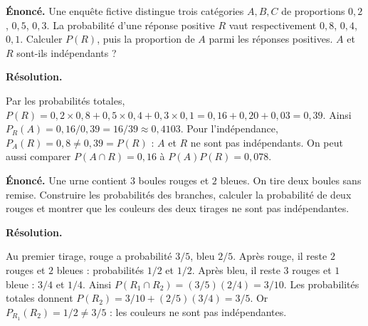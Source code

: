 \documentclass[11pt,a4paper]{article}
\begin{document}
\par\noindent\begin{minipage}{\linewidth}
{\small\color{Muted}\textbf{Énoncé.} Une enquête fictive distingue trois catégories $A,B,C$ de proportions $0,2$, $0,5$, $0,3$. La probabilité d’une réponse positive $R$ vaut respectivement $0,8$, $0,4$, $0,1$. Calculer $P(R)$, puis la proportion de $A$ parmi les réponses positives. $A$ et $R$ sont-ils indépendants ?}
\par\medskip
\textbf{Résolution.}\par
Par les probabilités totales, $P(R)=0,2\times0,8+0,5\times0,4+0,3\times0,1=0,16+0,20+0,03=0,39$. Ainsi $P_R(A)=0,16/0,39=16/39\approx0,4103$. Pour l’indépendance, $P_A(R)=0,8\ne0,39=P(R)$ : $A$ et $R$ ne sont pas indépendants. On peut aussi comparer $P(A\cap R)=0,16$ à $P(A)P(R)=0,078$.
\end{minipage}\par
\par\noindent\begin{minipage}{\linewidth}
{\small\color{Muted}\textbf{Énoncé.} Une urne contient $3$ boules rouges et $2$ bleues. On tire deux boules sans remise. Construire les probabilités des branches, calculer la probabilité de deux rouges et montrer que les couleurs des deux tirages ne sont pas indépendantes.}
\par\medskip
\textbf{Résolution.}\par
Au premier tirage, rouge a probabilité $3/5$, bleu $2/5$. Après rouge, il reste $2$ rouges et $2$ bleues : probabilités $1/2$ et $1/2$. Après bleu, il reste $3$ rouges et $1$ bleue : $3/4$ et $1/4$. Ainsi $P(R_1\cap R_2)=(3/5)(2/4)=3/10$. Les probabilités totales donnent $P(R_2)=3/10+(2/5)(3/4)=3/5$. Or $P_{R_1}(R_2)=1/2\ne3/5$ : les couleurs ne sont pas indépendantes.
\end{minipage}\par
\end{document}
